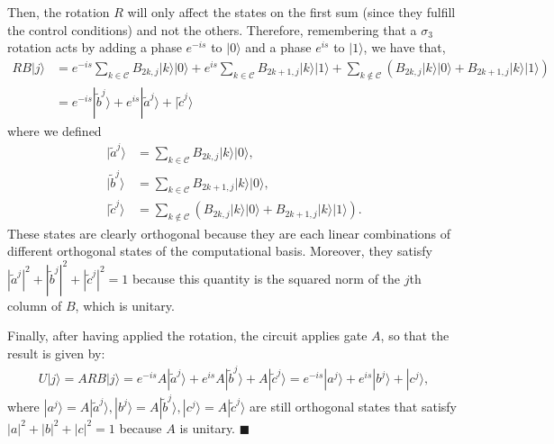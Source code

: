 \documentclass[10pt,letterpaper]{article} %
\begin{document}
Then, the rotation $R$ will only affect the states on the first sum (since they fulfill the control conditions)
and not the others. Therefore,  
remembering that a $\sigma_3$ rotation acts by adding a phase $e^{-is}$ to $|0\rangle$
and a phase $e^{is}$ to $|1\rangle$, we have that,
\begin{align}
RB|j\rangle& = e^{-is} \sum_{k \in \mathcal{C}} B_{2k,j} |k\rangle |0\rangle + e^{is} \sum_{k \in \mathcal{C}} B_{2k+1,j} |k\rangle |1\rangle 
+ \sum_{k \not\in \mathcal{C}} \left( B_{2k,j} |k\rangle|0\rangle  + B_{2k+1,j} |k \rangle |1\rangle  \right) \nonumber \\
& = e^{-is} |\tilde{b}^{j}\rangle + e^{is} |\tilde{a}^j\rangle + |\tilde{c}^j\rangle
\end{align}
where we defined
\begin{align*}
|\tilde{a}^j \rangle &= \sum_{k \in \mathcal{C}} B_{2k,j}|k\rangle|0\rangle,\\
|\tilde{b}^j\rangle &= \sum_{k \in \mathcal{C}} B_{2k+1,j} |k\rangle |0 \rangle,\\
|\tilde{c}^j\rangle &= \sum_{k \not\in \mathcal{C}}\left( B_{2k,j} |k\rangle|0\rangle+ B_{2k+1,j} |k \rangle |1\rangle  \right).
\end{align*}
These states are clearly orthogonal because they are each linear combinations of different 
orthogonal states of the computational basis. 
Moreover, they satisfy  $|\tilde{a}^j|^2 + |\tilde{b}^j|^2 + |\tilde{c}^j|^2 = 1$ because this quantity is the squared norm of the $j$th column of $B$, 
which is unitary.

Finally, after having applied the rotation, the circuit applies gate $A$, 
so that the result is given by:
\begin{eqnarray}
U|j\rangle = ARB|j\rangle = e^{-is} A |\tilde{a}^j\rangle + e^{is} A |\tilde{b}^j\rangle + A |\tilde{c}^j\rangle = e^{-is} |a^j\rangle + e^{is} |b^j\rangle + |c^j\rangle,
\end{eqnarray}
where $|a^j\rangle = A |\tilde{a}^j\rangle, |b^j\rangle = A |\tilde{b}^j\rangle, |c^j\rangle = A |\tilde{c}^j\rangle$ are still orthogonal
states that satisfy $|a|^2 + |b|^2 + |c|^2 = 1$ because $A$ is unitary. $\blacksquare$  \\
 $\;$ \\
\end{document}

